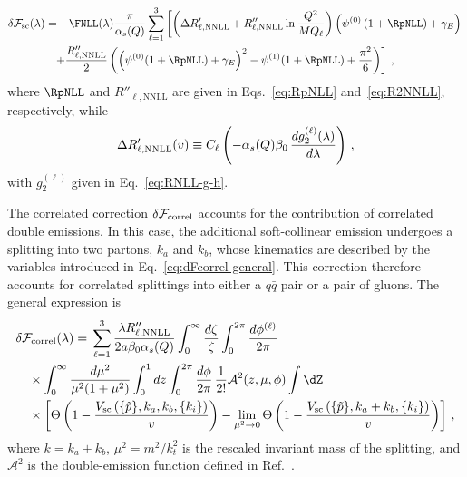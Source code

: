 \begin{equation}
\begin{aligned}
&\delta\mathcal{F}_{\mathrm{sc}}(\lambda)=-\FNLL(\lambda)\frac{\pi}{\alpha_s(Q)}\sum_{\ell=1}^3\left[\left(\Delta R'_{\ell,\mathrm{NNLL}}+ R''_{\ell,\mathrm{NNLL}}\ln\frac{Q^2}{M Q_{\ell}}\right)\left(\psi^{(0)}\left(1+\RpNLL\right)+\gamma_E\right)\right. \\
 &\qquad\qquad\left.+\frac{R''_{\ell,\mathrm{NNLL}}}{2}\left(\left(\psi^{(0)}(1+\RpNLL)+\gamma_E\right)^2-\psi^{(1)}(1+\RpNLL)+\frac{\pi^2}{6}\right)\right]\,,
 \end{aligned}
\end{equation}
where $\RpNLL$ and $R''_{\ell,\mathrm{NNLL}}$ are given in
Eqs.~\eqref{eq:RpNLL} and~\eqref{eq:R2NNLL}, respectively, while
\begin{equation}
\label{eq:DRNNLL}
\Delta R'_{\ell,\rm NNLL}(v) \equiv C_\ell\left(-\alpha_s(Q)\beta_0\,\frac{dg_2^{(\ell)}(\lambda)}{d\lambda}\right)\,,
\end{equation}
with $g_2^{(\ell)}$ given in Eq.~\eqref{eq:RNLL-g-h}.

The correlated correction $\delta\mathcal{F}_{\rm correl}$ accounts for
the contribution of correlated double emissions. In this case, the additional
soft-collinear emission undergoes a splitting into two partons,
$k_a$ and $k_b$, whose kinematics are described by the variables
introduced in Eq.~\eqref{eq:dFcorrel-general}. This correction therefore accounts for
correlated splittings into either a $q\bar q$ pair or a pair of gluons.
The general expression is
\begin{align}
&\delta\mathcal{F}_{\mathrm{correl}}(\lambda)={}\sum_{\ell=1}^3\frac{\lambda R''_{\ell,\mathrm{NNLL}}}{2a\beta_0\alpha_s(Q)}
\int_0^\infty\frac{d\zeta}{\zeta}\int_0^{2\pi}\frac{d\phi^{(\ell)}}{2\pi}\nonumber\\
&\quad\times\int_0^\infty
\frac{d\mu^2}{\mu^2(1+\mu^2)}\int_0^1dz\int_0^{2\pi}\frac{d\phi}{2\pi}\,\frac{1}{2!}\mathcal{A}^2(z,\mu,\phi)\int\dZ\nonumber\\
&\quad\times\left[ \Theta\left(1-\frac{V_{\mathrm{sc}}\left(\{\tilde{p}\},k_a,k_b,\{k_i\}\right)}{v}\right)-\lim_{\mu^2\to0}\Theta\left(1-\frac{V_{\mathrm{sc}}\left(\{\tilde{p}\},k_a+k_b,\{k_i\}\right)}{v}\right) \right]\,, \label{eq:dFcorrel-general}
\end{align}
where $k=k_a+k_b$, $\mu^2=m^2/k_t^2$ is the rescaled invariant mass of the
splitting, and $\mathcal{A}^2$ is the double-emission function defined in
Ref.~\cite{Arpino:2019ozn}. 

